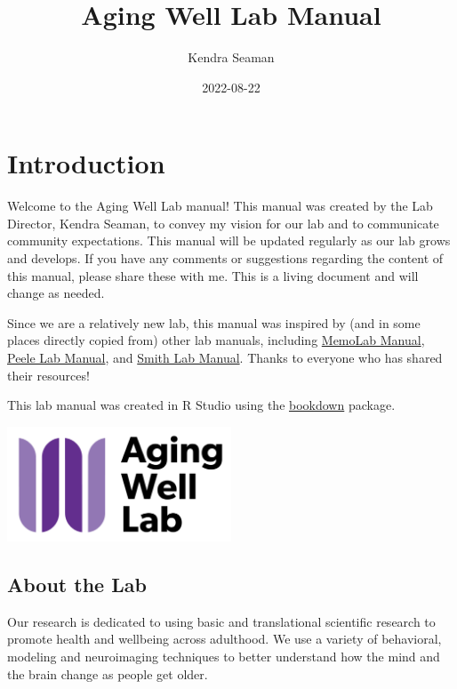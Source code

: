 \documentclass[
]{book}
\title{Aging Well Lab Manual}
\author{Kendra Seaman}
\date{2022-08-22}
\begin{document}
\maketitle

{
\setcounter{tocdepth}{1}
\tableofcontents
}
\hypertarget{introduction}{%
\chapter{Introduction}\label{introduction}}

Welcome to the Aging Well Lab manual! This manual was created by the Lab Director, Kendra Seaman, to convey my vision for our lab and to communicate community expectations. This manual will be updated regularly as our lab grows and develops. If you have any comments or suggestions regarding the content of this manual, please share these with me. This is a living document and will change as needed.

Since we are a relatively new lab, this manual was inspired by (and in some places directly copied from) other lab manuals, including \href{https://github.com/memobc/memolab-manual}{MemoLab Manual}, \href{http://jpeelle.net/peellelab_manual.pdf}{Peele Lab Manual}, and \href{https://github.com/DVSneuro/smithlab_manual/blob/master/SmithLab_manual.pdf}{Smith Lab Manual}. Thanks to everyone who has shared their resources!

This lab manual was created in R Studio using the \href{https://bookdown.org/yihui/bookdown/}{bookdown} package.

\includegraphics[width=0.5\textwidth,height=\textheight]{images/awl.png}

\hypertarget{about-the-lab}{%
\section{About the Lab}\label{about-the-lab}}

Our research is dedicated to using basic and translational scientific research to promote health and wellbeing across adulthood. We use a variety of behavioral, modeling and neuroimaging techniques to better understand how the mind and the brain change as people get older.
\end{document}
